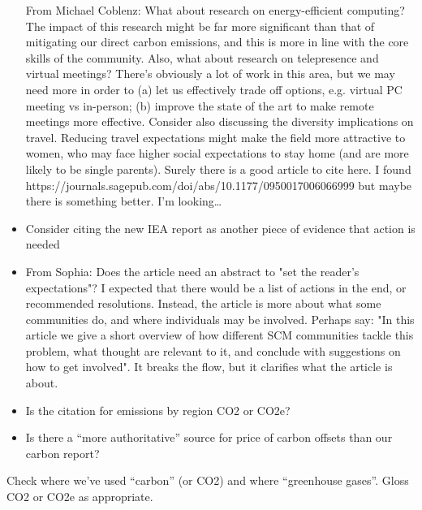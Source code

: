 \documentclass[12pt]{article}
\begin{document}
\begin{itemize}
From Michael Coblenz:
What about research on energy-efficient computing? The impact of this research might be far more significant than that of mitigating our direct carbon emissions, and this is more in line with the core skills of the community.
Also, what about research on telepresence and virtual meetings? There’s obviously a lot of work in this area, but we may need more in order to (a) let us effectively trade off options, e.g. virtual PC meeting vs in-person; (b) improve the state of the art to make remote meetings more effective.
Consider also discussing the diversity implications on travel. Reducing travel expectations might make the field more attractive to women, who may face higher social expectations to stay home (and are more likely to be single parents). Surely there is a good article to cite here. I found https://journals.sagepub.com/doi/abs/10.1177/0950017006066999 but maybe there is something better. I’m looking…
\item 
Consider citing the new IEA report as another piece of evidence that action is needed
\item 
From Sophia: Does the article need an abstract to "set the reader's expectations"? I expected that there would be a list of actions in the end, or recommended resolutions. Instead, the article is more about what some communities do, and where individuals may be involved.  Perhaps say: "In this article we give a short overview of how different SCM communities tackle this problem, what thought are relevant to it, and conclude with suggestions on how to get involved". It breaks the flow, but it clarifies what the article is about.
\item 
Is the citation for emissions by region CO2 or CO2e?
\item 
Is there a ``more authoritative'' source for price of carbon offsets than
our carbon report?
\end{itemize}
\item \item 
Check where we’ve used ``carbon'' (or CO2) and where ``greenhouse gases''.  Gloss CO2 or CO2e as appropriate.
\fi

\end{document}
